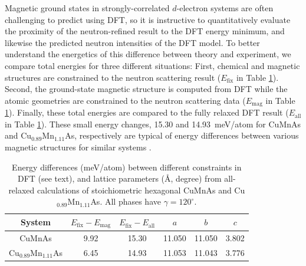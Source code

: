 \documentclass[10pt,doublespacing,edeposit]{uiucthesis2020}
\begin{document}
\begin{mainmatter}
Magnetic ground states in strongly-correlated $d$-electron systems are often challenging to predict using DFT,
so it is instructive to quantitatively evaluate the proximity of the neutron-refined result to the DFT energy minimum, and likewise the predicted neutron intensities of the DFT model.
To better understand the energetics of this difference between theory and experiment, we compare total energies for three different situations:
First, chemical and magnetic structures are constrained to the neutron scattering result ($E_\mathrm{fix}$ in Table \ref{tab:DFT-energy-latparam}).
Second, the ground-state magnetic structure is computed from DFT while the atomic geometries are constrained to the neutron scattering data ($E_\mathrm{mag}$ in Table \ref{tab:DFT-energy-latparam}).
Finally, these total energies are compared to the fully relaxed DFT result ($E_\mathrm{all}$ in Table \ref{tab:DFT-energy-latparam}).
These small energy changes, 15.30 and 14.93~meV/atom for CuMnAs and Cu$_{0.89}$Mn$_{1.11}$As, respectively are typical of energy differences between various magnetic structures for similar systems \cite{Alsolami2012Auth}.

\begin{table}
\caption{\label{tab:DFT-energy-latparam} 
Energy differences (meV/atom) between different constraints in DFT (see text), and lattice parameters (\AA, degree) from all-relaxed calculations of stoichiometric hexagonal CuMnAs and Cu$_{0.89}$Mn$_{1.11}$As. All phases have $\gamma = 120^\circ$.
}
\centering
\begin{tabular}{cccccc}
\hline\hline
System	 & $E_\mathrm{fix}-E_\mathrm{mag}$	 & $E_\mathrm{fix}-E_\mathrm{all}$	 & $a$	 & $b$	 & $c$ \\
\hline
CuMnAs	 & 9.92	 & 15.30	 & 11.050	 & 11.050	 & 3.802\\
Cu$_{0.89}$Mn$_{1.11}$As	 & 6.45	 & 14.93	 & 11.053	 & 11.043	 & 3.776\\
\hline \hline
\end{tabular}
~\\
\end{table}


\end{mainmatter}
\end{document}
